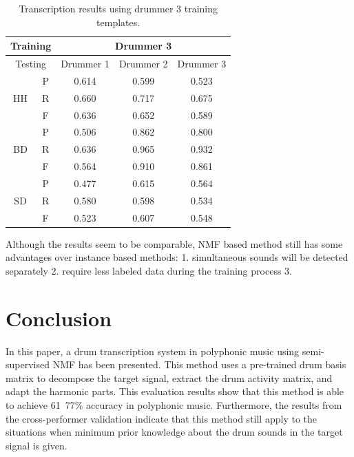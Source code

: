 \documentclass{article}
\begin{document}
\begin{table}[h]
\begin{center}
\begin{tabular}{|c|c|c|c|c|}
\hline
\multicolumn{2}{|c}{Training} & \multicolumn{3}{|c|}{Drummer 3}   \\ \hline
\multicolumn{2}{|c|}{Testing} & Drummer 1 & Drummer 2 & Drummer 3 \\ \hline
\multirow{3}{*}{HH}    & P    & 0.614     & 0.599     & 0.523     \\ \cline{2-5} 
                       & R    & 0.660     & 0.717     & 0.675     \\ \cline{2-5} 
                       & F    & 0.636     & 0.652     & 0.589     \\ \hline
\multirow{3}{*}{BD}    & P    & 0.506     & 0.862     & 0.800     \\ \cline{2-5} 
                       & R    & 0.636     & 0.965     & 0.932     \\ \cline{2-5} 
                       & F    & 0.564     & 0.910     & 0.861     \\ \hline
\multirow{3}{*}{SD}    & P    & 0.477     & 0.615     & 0.564     \\ \cline{2-5} 
                       & R    & 0.580     & 0.598     & 0.534     \\ \cline{2-5} 
                       & F    & 0.523     & 0.607     & 0.548     \\ \hline
\end{tabular}
 \caption{Transcription results using drummer 3 training templates.}
 \label{tab:trainDr3}
\end{center}
\end{table}

Although the results seem to be comparable, NMF based method still has some advantages over instance based methods: 1. simultaneous sounds will be detected separately  2. require less labeled data during the training process 3. 




\section{Conclusion}\label{sec:Conclusion}

In this paper, a drum transcription system in polyphonic music using semi-supervised NMF has been presented. This method uses a pre-trained drum basis matrix to decompose the target signal, extract the drum activity matrix, and adapt the harmonic parts. This evaluation results show that this method is able to achieve 61~77\% accuracy in polyphonic music. Furthermore, the results from the cross-performer validation indicate that this method still apply to the situations when minimum prior knowledge about the drum sounds in the target signal is given.  
\end{document}
